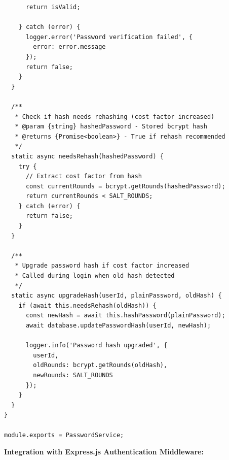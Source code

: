 \documentclass[12pt,a4paper]{article}
\begin{document}
\begin{verbatim}
      return isValid;
      
    } catch (error) {
      logger.error('Password verification failed', { 
        error: error.message 
      });
      return false;
    }
  }
  
  /**
   * Check if hash needs rehashing (cost factor increased)
   * @param {string} hashedPassword - Stored bcrypt hash
   * @returns {Promise<boolean>} - True if rehash recommended
   */
  static async needsRehash(hashedPassword) {
    try {
      // Extract cost factor from hash
      const currentRounds = bcrypt.getRounds(hashedPassword);
      return currentRounds < SALT_ROUNDS;
    } catch (error) {
      return false;
    }
  }
  
  /**
   * Upgrade password hash if cost factor increased
   * Called during login when old hash detected
   */
  static async upgradeHash(userId, plainPassword, oldHash) {
    if (await this.needsRehash(oldHash)) {
      const newHash = await this.hashPassword(plainPassword);
      await database.updatePasswordHash(userId, newHash);
      
      logger.info('Password hash upgraded', {
        userId,
        oldRounds: bcrypt.getRounds(oldHash),
        newRounds: SALT_ROUNDS
      });
    }
  }
}

module.exports = PasswordService;
\end{verbatim}

\vspace{0.5em}

\textbf{Integration with Express.js Authentication Middleware:}
\end{document}
